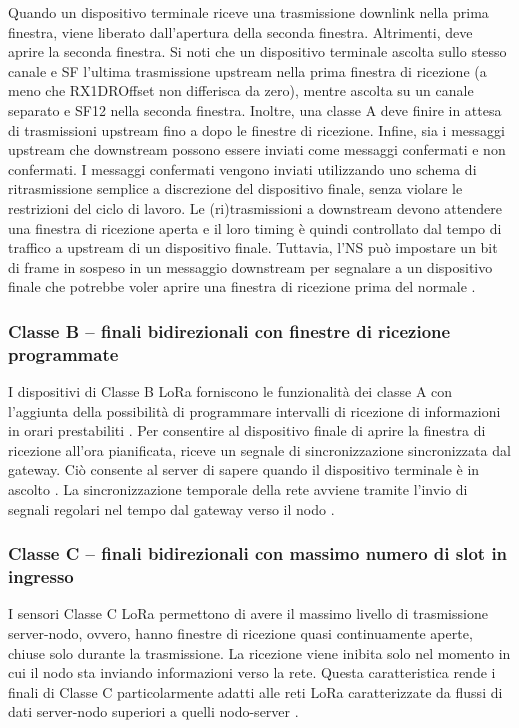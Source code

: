 \documentclass[a4paper]{report} %
\begin{document}
Quando un dispositivo terminale riceve una trasmissione downlink nella prima finestra, viene liberato dall'apertura della seconda finestra. Altrimenti, deve aprire la seconda finestra. Si noti che un dispositivo terminale ascolta sullo stesso canale e SF l'ultima trasmissione upstream nella prima finestra di ricezione (a meno che RX1DROffset non differisca da zero), mentre ascolta su un canale separato e SF12 nella seconda finestra. Inoltre, una classe A deve finire in attesa di trasmissioni upstream fino a dopo le finestre di ricezione. Infine, sia i messaggi upstream che downstream possono essere inviati come messaggi confermati e non confermati. I messaggi confermati vengono inviati utilizzando uno schema di ritrasmissione semplice a discrezione del dispositivo finale, senza violare le restrizioni del ciclo di lavoro. Le (ri)trasmissioni a downstream devono attendere una finestra di ricezione aperta e il loro timing è quindi controllato dal tempo di traffico a upstream di un dispositivo finale. Tuttavia, l'NS può impostare un bit di frame in sospeso in un messaggio downstream per segnalare a un dispositivo finale che potrebbe voler aprire una finestra di ricezione prima del normale \cite{art:rif.49}.

\subsubsection{Classe B – finali bidirezionali con finestre di ricezione programmate}
I dispositivi di Classe B LoRa forniscono le funzionalità dei classe A con l’aggiunta della possibilità di programmare intervalli di ricezione di informazioni in orari prestabiliti \cite{art:rif.27}. 
Per consentire al dispositivo finale di aprire la finestra di ricezione all'ora pianificata, riceve un segnale di sincronizzazione sincronizzata dal gateway. Ciò consente al server di sapere quando il dispositivo terminale è in ascolto \cite{art:rif.31}. 
La sincronizzazione temporale della rete avviene tramite l’invio di segnali regolari nel tempo dal gateway verso il nodo \cite{art:rif.27}.
\subsubsection{Classe C – finali bidirezionali con massimo numero di slot in ingresso}
I sensori Classe C LoRa permettono di avere il massimo livello di trasmissione server-nodo, ovvero, hanno finestre di ricezione quasi continuamente aperte, chiuse solo durante la trasmissione. La ricezione viene inibita solo nel momento in cui il nodo sta inviando informazioni verso la rete. Questa caratteristica rende i finali di Classe C particolarmente adatti alle reti LoRa caratterizzate da flussi di dati server-nodo superiori a quelli nodo-server \cite{art:rif.27}.
\end{document}
